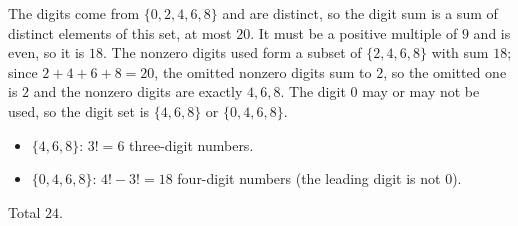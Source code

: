 The digits come from $\{0,2,4,6,8\}$ and are distinct, so the digit sum is a sum of distinct elements of this set, at most $20$. It must be a positive multiple of $9$ and is even, so it is $18$. The nonzero digits used form a subset of $\{2,4,6,8\}$ with sum $18$; since $2+4+6+8=20$, the omitted nonzero digits sum to $2$, so the omitted one is $2$ and the nonzero digits are exactly $4,6,8$. The digit $0$ may or may not be used, so the digit set is $\{4,6,8\}$ or $\{0,4,6,8\}$.
\begin{itemize}
\item $\{4,6,8\}$: $3!=6$ three-digit numbers.
\item $\{0,4,6,8\}$: $4!-3!=18$ four-digit numbers (the leading digit is not $0$).
\end{itemize}
Total $\boxed{24}$.
